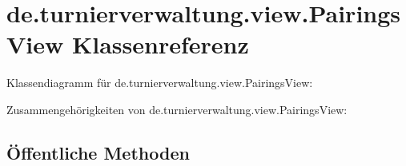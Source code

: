 \hypertarget{classde_1_1turnierverwaltung_1_1view_1_1_pairings_view}{}\section{de.\+turnierverwaltung.\+view.\+Pairings\+View Klassenreferenz}
\label{classde_1_1turnierverwaltung_1_1view_1_1_pairings_view}


Klassendiagramm für de.\+turnierverwaltung.\+view.\+Pairings\+View\+:


Zusammengehörigkeiten von de.\+turnierverwaltung.\+view.\+Pairings\+View\+:
\subsection*{Öffentliche Methoden}
